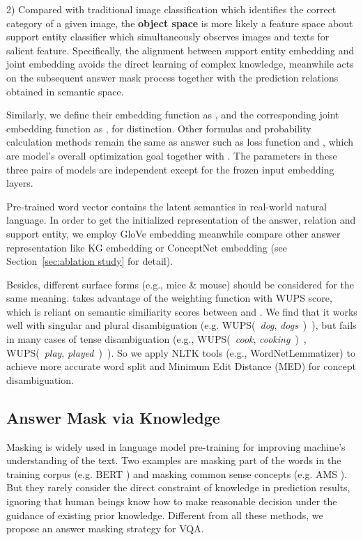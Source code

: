 \documentclass[runningheads]{llncs}
\newcommand{\cjy}[1]{{\color{black}#1}}
\newcommand{\jeff}[1]{{\color{black}#1}}
\begin{document}
2) Compared with traditional image classification which identifies the correct category of a given image, the \textbf{object space} is more likely a feature space about support entity classifier which simultaneously observes images and texts for salient feature. 
Specifically, the alignment between support entity  embedding and   joint embedding avoids the direct learning of complex knowledge, meanwhile acts on the subsequent answer mask process together with the prediction relations  obtained in semantic space. 

Similarly, we define their embedding function as ,  and the corresponding   joint embedding function as ,  for distinction.
Other formulas and probability calculation methods remain the same as answer such as loss function  and , which are model's overall optimization goal together with . The parameters in these three pairs of models are independent except for the frozen input embedding layers.

Pre-trained word vector contains the latent semantics in real-world natural language. In order to get the initialized representation of the answer, relation and support entity, we employ GloVe embedding \cite{DBLP:conf/emnlp/PenningtonSM14} meanwhile  compare other answer representation like KG embedding \cite{DBLP:conf/nips/BordesUGWY13} or ConceptNet embedding \cite{DBLP:conf/aaai/MalaviyaBBC20} (see Section~\ref{sec:ablation study} for detail).

Besides,  
\jeff{different surface forms (e.g., mice \& mouse) should be considered for the same meaning}. 
\cite{DBLP:conf/cvpr/HuCS18} takes advantage of the weighting function  with WUPS score, which is reliant on semantic similiarity scores between  and . We find that it works well with singular and plural disambiguation (e.g. WUPS(~{\it dog}, {\it dogs}~)~), but fails in many cases of tense disambiguation (e.g., WUPS(~{\it cook}, {\it cooking}~)~, WUPS(~{\it play}, {\it played}~)~). 
So we apply NLTK tools (e.g., WordNetLemmatizer) to achieve more accurate word split and Minimum Edit Distance (MED) for concept disambiguation.
\subsection{Answer Mask via Knowledge}
\cjy{Masking is widely used in language model pre-training for improving machine's understanding of the text. Two examples are masking part of the words in the training corpus
 (e.g. BERT \cite{DBLP:conf/naacl/DevlinCLT19}) and} masking common sense concepts (e.g. AMS \cite{DBLP:journals/corr/abs-1908-06725}). 
But they rarely consider the direct constraint of knowledge in prediction results, \cjy{ignoring that }human beings know how to make reasonable decision under the guidance of existing prior knowledge.
Different from all these methods, we propose an answer masking strategy for VQA.
\end{document}
